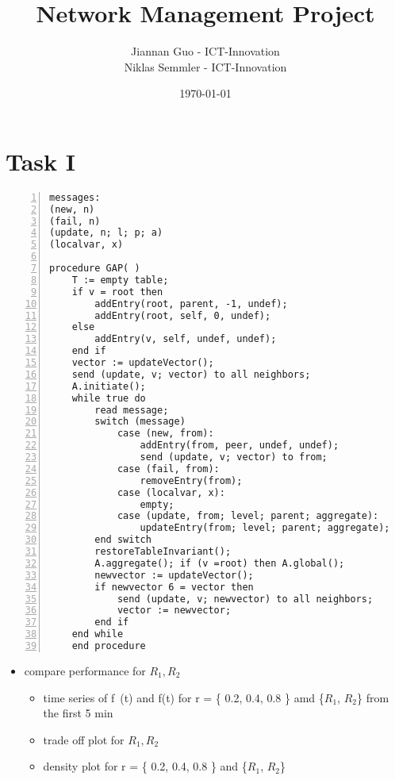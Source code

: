 \documentclass[a4paper, smallheadings,english]{scrartcl}
\newcommand{\Author}{Jiannan Guo - ICT-Innovation\\Niklas Semmler - ICT-Innovation}
\newcommand{\Title}{Network Management Project}
\begin{document}
\title{\Title}
\author{\Author}
\date{\today}
\maketitle
\thispagestyle{firststyle}
\section{Task I}
\begin{lstlisting}[caption={inspired by \cite{stadler2012protocols}}, numbers=left, frame=single]
messages:
(new, n)
(fail, n)
(update, n; l; p; a)
(localvar, x)

procedure GAP( )
    T := empty table;
    if v = root then
        addEntry(root, parent, -1, undef);
        addEntry(root, self, 0, undef);
    else
        addEntry(v, self, undef, undef);
    end if
    vector := updateVector();
    send (update, v; vector) to all neighbors;
    A.initiate();
    while true do
        read message;
        switch (message)
            case (new, from):
                addEntry(from, peer, undef, undef);
                send (update, v; vector) to from;
            case (fail, from):
                removeEntry(from);
            case (localvar, x):
                empty;
            case (update, from; level; parent; aggregate):
                updateEntry(from; level; parent; aggregate);
        end switch
        restoreTableInvariant();
        A.aggregate(); if (v =root) then A.global();
        newvector := updateVector();
        if newvector 6 = vector then
            send (update, v; newvector) to all neighbors;
            vector := newvector;
        end if
    end while
    end procedure
\end{lstlisting}

\begin{itemize}
    \item compare performance for $R_1, R_2$
    \begin{itemize}
        \item time series of f~(t) and f(t) for r = \{ 0.2, 0.4, 0.8 \} amd \{$R_1$, $R_2$\} from the first 5 min
        \item trade off plot for $R_1, R_2$
        \item density plot for r = \{ 0.2, 0.4, 0.8 \} and \{$R_1$, $R_2$\}
    \end{itemize}
\end{itemize}
\end{document}
